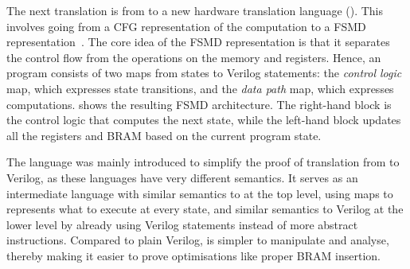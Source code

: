 
The next translation is from \rtl{} to a new hardware translation language
(\htl{}).  This involves going from a CFG representation of the computation to a
\gls{FSMD} representation~\cite{hwang99_ffplp}. The core idea of the FSMD
representation is that it separates the control flow from the operations on the
memory and registers.  Hence, an \htl{} program consists of two maps from states
to Verilog statements: the \emph{\gls{control logic}} map, which expresses state
transitions, and the \emph{\gls{data path}} map, which expresses computations.
 shows the resulting \gls{FSMD} architecture. The
right-hand block is the control logic that computes the next state, while the
left-hand block updates all the registers and \gls{BRAM} based on the current
program state.

The \htl{} language was mainly introduced to simplify the proof of translation
from \rtl{} to Verilog, as these languages have very different semantics.  It
serves as an intermediate language with similar semantics to \rtl{} at the top
level, using maps to represents what to execute at every state, and similar
semantics to Verilog at the lower level by already using Verilog statements
instead of more abstract instructions.  Compared to plain Verilog, \htl{} is
simpler to manipulate and analyse, thereby making it easier to prove
optimisations like proper \gls{BRAM} insertion.

